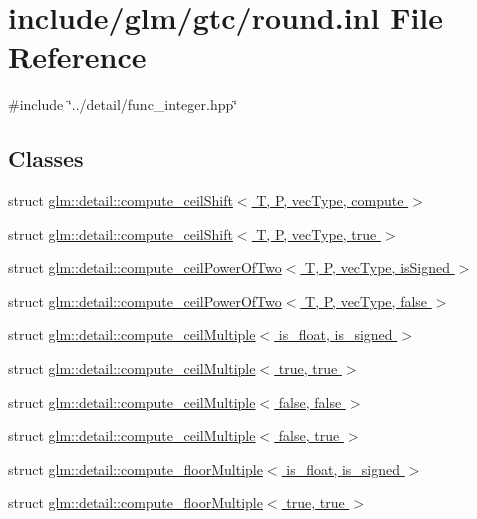 \hypertarget{round_8inl}{}\section{include/glm/gtc/round.inl File Reference}
\label{round_8inl}
{\ttfamily \#include \char`\"{}../detail/func\+\_\+integer.\+hpp\char`\"{}}\newline
\subsection*{Classes}
\begin{DoxyCompactItemize}
\item 
struct \hyperlink{structglm_1_1detail_1_1compute__ceilShift}{glm\+::detail\+::compute\+\_\+ceil\+Shift$<$ T, P, vec\+Type, compute $>$}
\item 
struct \hyperlink{structglm_1_1detail_1_1compute__ceilShift_3_01T_00_01P_00_01vecType_00_01true_01_4}{glm\+::detail\+::compute\+\_\+ceil\+Shift$<$ T, P, vec\+Type, true $>$}
\item 
struct \hyperlink{structglm_1_1detail_1_1compute__ceilPowerOfTwo}{glm\+::detail\+::compute\+\_\+ceil\+Power\+Of\+Two$<$ T, P, vec\+Type, is\+Signed $>$}
\item 
struct \hyperlink{structglm_1_1detail_1_1compute__ceilPowerOfTwo_3_01T_00_01P_00_01vecType_00_01false_01_4}{glm\+::detail\+::compute\+\_\+ceil\+Power\+Of\+Two$<$ T, P, vec\+Type, false $>$}
\item 
struct \hyperlink{structglm_1_1detail_1_1compute__ceilMultiple}{glm\+::detail\+::compute\+\_\+ceil\+Multiple$<$ is\+\_\+float, is\+\_\+signed $>$}
\item 
struct \hyperlink{structglm_1_1detail_1_1compute__ceilMultiple_3_01true_00_01true_01_4}{glm\+::detail\+::compute\+\_\+ceil\+Multiple$<$ true, true $>$}
\item 
struct \hyperlink{structglm_1_1detail_1_1compute__ceilMultiple_3_01false_00_01false_01_4}{glm\+::detail\+::compute\+\_\+ceil\+Multiple$<$ false, false $>$}
\item 
struct \hyperlink{structglm_1_1detail_1_1compute__ceilMultiple_3_01false_00_01true_01_4}{glm\+::detail\+::compute\+\_\+ceil\+Multiple$<$ false, true $>$}
\item 
struct \hyperlink{structglm_1_1detail_1_1compute__floorMultiple}{glm\+::detail\+::compute\+\_\+floor\+Multiple$<$ is\+\_\+float, is\+\_\+signed $>$}
\item 
struct \hyperlink{structglm_1_1detail_1_1compute__floorMultiple_3_01true_00_01true_01_4}{glm\+::detail\+::compute\+\_\+floor\+Multiple$<$ true, true $>$}

\end{DoxyCompactItemize}

